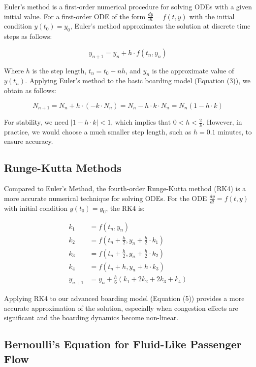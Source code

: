 \documentclass[12pt]{article}
\begin{document}
Euler's method is a first-order numerical procedure for solving ODEs with a given initial value. For a first-order ODE of the form $\frac{dy}{dt} = f(t, y)$ with the initial condition $y(t_0) = y_0$, Euler's method approximates the solution at discrete time steps as follows:

\begin{equation}
y_{n+1} = y_n + h \cdot f(t_n, y_n)
\end{equation}

Where $h$ is the step length, $t_n = t_0 + nh$, and $y_n$ is the approximate value of $y(t_n)$. Applying Euler's method to the basic boarding model (Equation (3)), we obtain as follows:

\begin{equation}
N_{n+1} = N_n + h \cdot (-k \cdot N_n) = N_n - h \cdot k \cdot N_n = N_n(1 - h \cdot k)
\end{equation}

For stability, we need $|1 - h \cdot k| < 1$, which implies that $0 < h < \frac{2}{k}$. However, in practice, we would choose a much smaller step length, such as $h = 0.1$ minutes, to ensure accuracy.

\subsection{Runge-Kutta Methods}

Compared to Euler's Method, the fourth-order Runge-Kutta method (RK4) is a more accurate numerical technique for solving ODEs. For the ODE $\frac{dy}{dt} = f(t, y)$ with initial condition $y(t_0) = y_0$, the RK4 is:

\begin{align}
k_1 &= f(t_n, y_n) \\
k_2 &= f\left(t_n + \frac{h}{2}, y_n + \frac{h}{2} \cdot k_1\right) \\
k_3 &= f\left(t_n + \frac{h}{2}, y_n + \frac{h}{2} \cdot k_2\right) \\
k_4 &= f(t_n + h, y_n + h \cdot k_3) \\
y_{n+1} &= y_n + \frac{h}{6}(k_1 + 2k_2 + 2k_3 + k_4)
\end{align}

Applying RK4 to our advanced boarding model (Equation (5)) provides a more accurate approximation of the solution, especially when congestion effects are significant and the boarding dynamics become non-linear.

\subsection{Bernoulli's Equation for Fluid-Like Passenger Flow}
\end{document}

